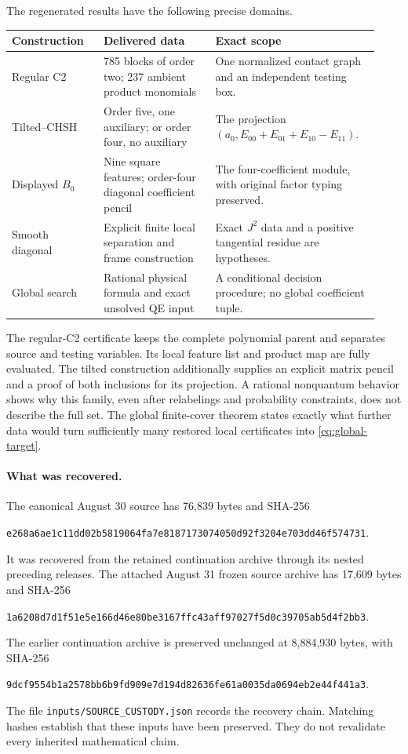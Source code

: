 \documentclass[11pt,a4paper]{article}
\theoremstyle{definition}
\theoremstyle{remark}
\begin{document}
The regenerated results have the following precise domains.
\begin{center}
\small
\begin{tabular}{@{}p{0.23\linewidth}p{0.29\linewidth}p{0.41\linewidth}@{}}
\toprule
Construction & Delivered data & Exact scope\\
\midrule
Regular C2 & 785 blocks of order two; 237 ambient product monomials
 & One normalized contact graph and an independent testing box.\\[5pt]
Tilted--CHSH & Order five, one auxiliary; or order four, no auxiliary
 & The projection $(a_0,E_{00}+E_{01}+E_{10}-E_{11})$.\\[5pt]
Displayed $B_0$ & Nine square features; order-four diagonal coefficient pencil
 & The four-coefficient module, with original factor typing preserved.\\[5pt]
Smooth diagonal & Explicit finite local separation and frame construction
 & Exact $J^2$ data and a positive tangential residue are hypotheses.\\[5pt]
Global search & Rational physical formula and exact unsolved QE input
 & A conditional decision procedure; no global coefficient tuple.\\
\bottomrule
\end{tabular}
\end{center}

The regular-C2 certificate keeps the complete polynomial parent and
separates source and testing variables. Its local feature list and product
map are fully evaluated. The tilted construction additionally supplies an
explicit matrix pencil and a proof of both inclusions for its projection.
A rational nonquantum behavior shows why this family, even after
relabelings and probability constraints, does not describe the full set.
The global finite-cover theorem states exactly what further data would
turn sufficiently many restored local certificates into
\eqref{eq:global-target}.

\paragraph{What was recovered.}
The canonical August 30 source has 76,839 bytes and SHA-256
\begin{center}\small
\nolinkurl{e268a6ae1c11dd02b5819064fa7e8187173074050d92f3204e703dd46f574731}.
\end{center}
It was recovered from the retained continuation archive through its
nested preceding releases. The attached August 31 frozen source archive
has 17,609 bytes and SHA-256
\begin{center}\small
\nolinkurl{1a6208d7d1f51e5e166d46e80be3167ffc43aff97027f5d0c39705ab5d4f2bb3}.
\end{center}
The earlier continuation archive is preserved unchanged at 8,884,930
bytes, with SHA-256
\begin{center}\small
\nolinkurl{9dcf9554b1a2578bb6b9fd909e7d194d82636fe61a0035da0694eb2e44f441a3}.
\end{center}
The file \nolinkurl{inputs/SOURCE_CUSTODY.json} records the recovery chain.
Matching hashes establish that these inputs have been preserved. They do
not revalidate every inherited mathematical claim.
\end{document}
